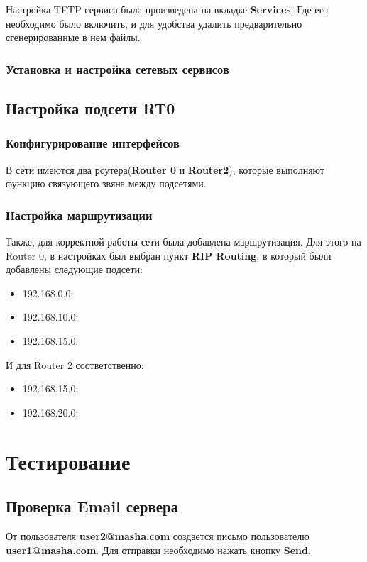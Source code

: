 \documentclass[14pt,a4paper,report]{report}
\begin{document}
Настройка TFTP сервиса была произведена на вкладке \textbf{Services}. Где его необходимо было включить, и для удобства удалить предварительно сгенерированные в нем файлы.


\subsubsection{Установка и настройка сетевых сервисов}


\subsection{Настройка подсети RT0}
\subsubsection{Конфигурирование интерфейсов}
В сети имеются два роутера(\textbf{Router 0} и \textbf{Router2}), которые выполняют функцию связующего звяна между подсетями.



\subsubsection{Настройка маршрутизации}
Также, для корректной работы сети была добавлена маршрутизация. Для этого на Router 0, в настройках был выбран пункт \textbf{RIP Routing}, в который были добавлены следующие подсети:
\begin{itemize}
\item 192.168.0.0;
\item 192.168.10.0;
\item 192.168.15.0.
\end{itemize}
И для Router 2 соответственно:
\begin{itemize}
\item 192.168.15.0;
\item 192.168.20.0;
\end{itemize}


\section{Тестирование}
\subsection{Проверка Email сервера}
От пользователя \textbf{user2@masha.com} создается письмо пользователю \textbf{user1@masha.com}. Для отправки необходимо нажать кнопку \textbf{Send}.
\end{document}
